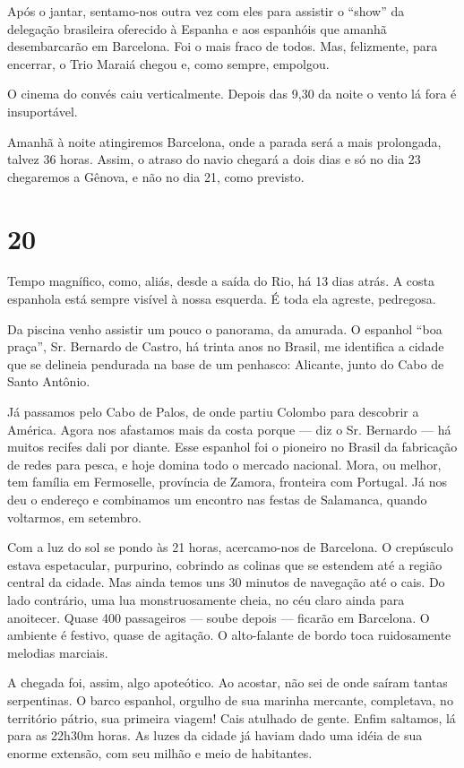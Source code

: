 Após o jantar, sentamo-nos outra vez com eles para assistir o ``show'' da delegação brasileira oferecido à Espanha e aos espanhóis que amanhã desembarcarão em Barcelona. Foi o mais fraco de todos. Mas, felizmente, para encerrar, o Trio Maraiá chegou e, como sempre, empolgou.

O cinema do convés caiu verticalmente. Depois das 9,30 da noite o vento lá fora é insuportável.

Amanhã à noite atingiremos Barcelona, onde a parada será a mais prolongada, talvez 36 horas. Assim, o atraso do navio chegará a dois dias e só no dia 23 chegaremos a Gênova, e não no dia 21, como previsto.

\section*{20 \adfflatleafright {}}

Tempo magnífico, como, aliás, desde a saída do Rio, há 13 dias atrás. A costa espanhola está sempre visível à nossa esquerda. É toda ela agreste, pedregosa.

Da piscina venho assistir um pouco o panorama, da amurada. O espanhol ``boa praça'', Sr. Bernardo de Castro, há trinta anos no Brasil, me identifica a cidade que se delineia pendurada na base de um penhasco: Alicante, junto do Cabo de Santo Antônio.

Já passamos pelo Cabo de Palos, de onde partiu Colombo para descobrir a América. Agora nos afastamos mais da costa porque --- diz o Sr. Bernardo --- há muitos recifes dali por diante. Esse espanhol foi o pioneiro no Brasil da fabricação de redes para pesca, e hoje domina todo o mercado nacional. Mora, ou melhor, tem família em Fermoselle, província de Zamora, fronteira com Portugal. Já nos deu o endereço e combinamos um encontro nas festas de Salamanca, quando voltarmos, em setembro.

Com a luz do sol se pondo às 21 horas, acercamo-nos de Barcelona. O crepúsculo estava espetacular, purpurino, cobrindo as colinas que se estendem até a região central da cidade. Mas ainda temos uns 30 minutos de navegação até o cais. Do lado contrário, uma lua monstruosamente cheia, no céu claro ainda para anoitecer. Quase 400 passageiros --- soube depois --- ficarão em Barcelona. O ambiente é festivo, quase de agitação. O alto-falante de bordo toca ruidosamente melodias marciais.

A chegada foi, assim, algo apoteótico. Ao acostar, não sei de onde saíram tantas serpentinas. O barco espanhol, orgulho de sua marinha mercante, completava, no território pátrio, sua primeira viagem! Cais atulhado de gente. Enfim saltamos, lá para as 22h30m horas. As luzes da cidade já haviam dado uma idéia de sua enorme extensão, com seu milhão e meio de habitantes.

